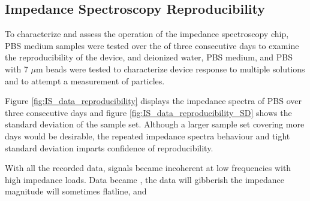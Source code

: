 \subsection{Impedance Spectroscopy Reproducibility}

\par To characterize and assess the operation of the impedance spectroscopy chip, PBS medium samples were tested over the of three consecutive days to examine the reproducibility of the device, and deionized water, PBS medium, and PBS with 7 $\mu$m beads were tested to characterize device response to multiple solutions and to attempt a measurement of particles.

\par Figure \ref{fig:IS_data_reproducibility} displays the impedance spectra of PBS over three consecutive days and figure \ref{fig:IS_data_reproducibility_SD} shows the standard deviation of the sample set. Although a larger sample set covering more days would be desirable, the repeated impedance spectra behaviour and tight standard deviation imparts confidence of reproducibility.

\par With all the recorded data, signals became incoherent at low frequencies with high impedance loads. Data became , the data will gibberish the impedance magnitude will sometimes flatline, and 

